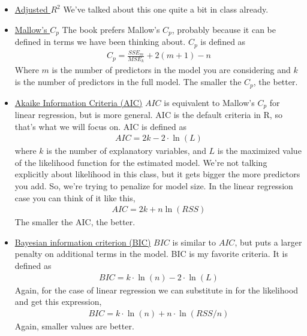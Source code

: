 \documentclass[10pt]{article}
\begin{document}
\begin{itemize}
\item \href{http://en.wikipedia.org/wiki/Coefficient_of_determination#Adjusted_R2}{Adjusted $R^2$} We've talked about this one quite a bit in class already. 
\item \href{http://en.wikipedia.org/wiki/Mallows\%27s_Cp}{Mallow's $C_p$} The book prefers Mallow's $C_p$, probably because it can be defined in terms we have been thinking about. $C_p$ is defined as
  \begin{eqnarray*}
  C_p = \frac{SSE_m}{MSE_k}+ 2(m+1)-n
  \end{eqnarray*}
Where $m$ is the number of predictors in the model you are considering and $k$ is the number of predictors in the full model. The smaller the $C_p$, the better. 
\item \href{http://en.wikipedia.org/wiki/Akaike_information_criterion}{Akaike Information Criteria (AIC)} $AIC$ is equivalent to Mallow's $C_p$ for linear regression, but is more general. AIC is the default criteria in R, so that's what we will focus on. AIC is defined as
	\begin{eqnarray*}
			AIC = 2k - 2 \cdot \ln{(L)}
  \end{eqnarray*}
		where $k$ is the number of explanatory variables, and $L$ is the maximized value of the likelihood function for the estimated model. We're not talking explicitly about likelihood in this class, but it gets bigger the more predictors you add. So, we're trying to penalize for model size. In the linear regression case you can think of it like this,
		\begin{eqnarray*}
		AIC = 2k + n\ln{(RSS)}
		\end{eqnarray*}
		The smaller the AIC, the better. 
\item \href{http://en.wikipedia.org/wiki/Bayesian_information_criterion}{Bayesian information criterion (BIC)} $BIC$ is similar to $AIC$, but puts a larger penalty on additional terms in the model. BIC is my favorite criteria. It is defined as
\begin{eqnarray*}
			BIC = k \cdot \ln{(n)}  -2\cdot\ln{(L)}
  \end{eqnarray*}
  Again, for the case of linear regression we can substitute in for the likelihood and get this expression,
  \begin{eqnarray*}
  BIC = k\cdot\ln({n}) + n\cdot\ln{(RSS/n)} 
  \end{eqnarray*}
  Again, smaller values are better.
\end{itemize}
\end{document}
